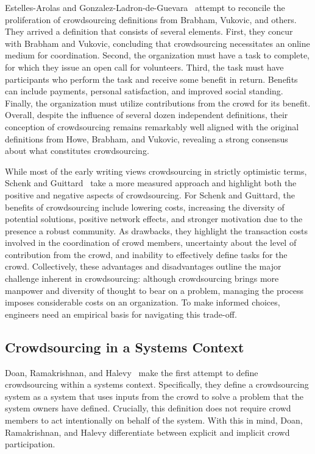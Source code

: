 Estelles-Arolas and Gonzalez-Ladron-de-Guevara~\cite{estelles} attempt to reconcile the proliferation of crowdsourcing definitions from Brabham, Vukovic, and others. They arrived a definition that consists of several elements. First, they concur with Brabham and Vukovic, concluding that crowdsourcing necessitates an online medium for coordination. Second, the organization must have a task to complete, for which they issue an open call for volunteers. Third, the task must have participants who perform the task and receive some benefit in return. Benefits can include payments, personal satisfaction, and improved social standing. Finally, the organization must utilize contributions from the crowd for its benefit. Overall, despite the influence of several dozen independent definitions, their conception of crowdsourcing remains remarkably well aligned with the original definitions from Howe, Brabham, and Vukovic, revealing a strong consensus about what constitutes crowdsourcing.

While most of the early writing views crowdsourcing in strictly optimistic terms, Schenk and Guittard~\cite{schenk} take a more measured approach and highlight both the positive and negative aspects of crowdsourcing. For Schenk and Guittard, the benefits of crowdsourcing include lowering costs, increasing the diversity of potential solutions, positive network effects, and stronger motivation due to the presence a robust community. As drawbacks, they highlight the transaction costs involved in the coordination of crowd members, uncertainty about the level of contribution from the crowd, and inability to effectively define tasks for the crowd. Collectively, these advantages and disadvantages outline the major challenge inherent in crowdsourcing: although crowdsourcing brings more manpower and diversity of thought to bear on a problem, managing the process imposes considerable costs on an organization. To make informed choices, engineers need an empirical basis for navigating this trade-off.

\subsection{Crowdsourcing in a Systems Context}

Doan, Ramakrishnan, and Halevy~\cite{doan} make the first attempt to define crowdsourcing within a systems context. Specifically, they define a crowdsourcing system as a system that uses inputs from the crowd to solve a problem that the system owners have defined. Crucially, this definition does not require crowd members to act intentionally on behalf of the system. With this in mind, Doan, Ramakrishnan, and Halevy differentiate between explicit and implicit crowd participation.

